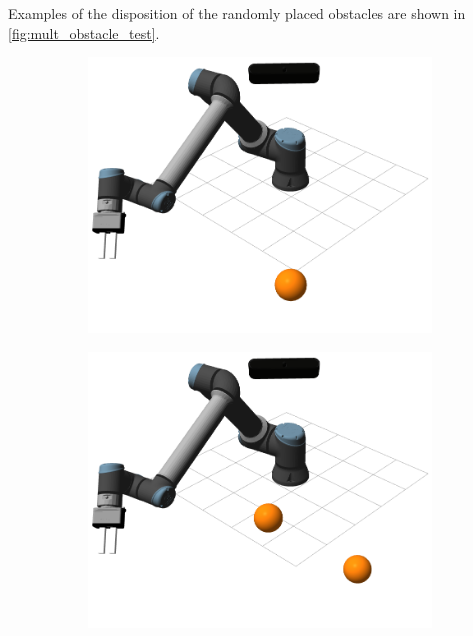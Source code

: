 \par Examples of the disposition of the randomly placed obstacles are shown in \autoref{fig:mult_obstacle_test}.

\begin{figure}[h]
    \centering
    \begin{subfigure}{.2\linewidth}
        \centering
        \includegraphics[width=.95\linewidth]{figs/chp6/obstacle_1.png}
    \end{subfigure}%
    \begin{subfigure}{.2\linewidth}
        \centering
        \includegraphics[width=.95\linewidth]{figs/chp6/obstacle_2.png}
    \end{subfigure}%

\end{figure}
